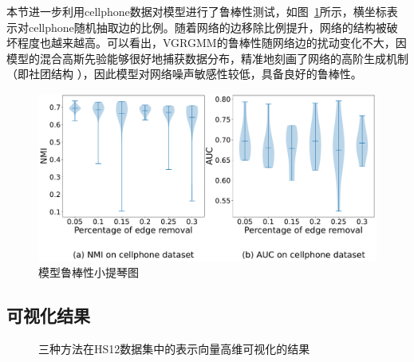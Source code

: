 本节进一步利用cellphone数据对模型进行了鲁棒性测试，如图~\ref{fig:robustWP}所示，横坐标表示对cellphone随机抽取边的比例。随着网络的边移除比例提升，网络的结构被破坏程度也越来越高。可以看出，VGRGMM的鲁棒性随网络边的扰动变化不大，因模型的混合高斯先验能够很好地捕获数据分布，精准地刻画了网络的高阶生成机制（即社团结构 ），因此模型对网络噪声敏感性较低，具备良好的鲁棒性。
\begin{figure}[htbp]
	\centering
	\includegraphics[width=.6\textwidth]{figures/chap06/workplaceRBNA.pdf}
	\caption{模型鲁棒性小提琴图}
	\label{fig:robustWP}
\end{figure}

\subsection{可视化结果}

\begin{figure}[htbp]
    \centering
    \caption{三种方法在HS12数据集中的表示向量高维可视化的结果}
    \label{fig:Visu}
\end{figure}

